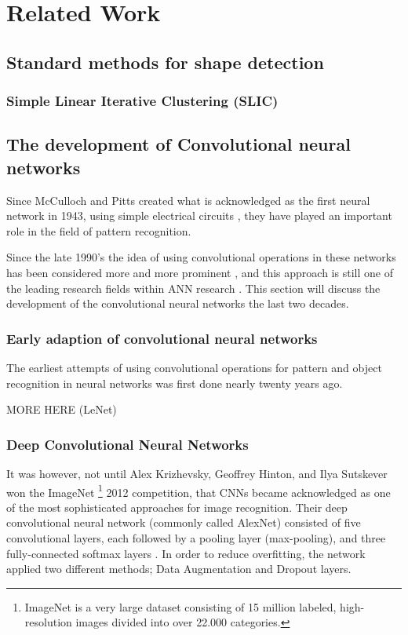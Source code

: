 \chapter{Related Work}

\section{Standard methods for shape detection}

\subsection{Simple Linear Iterative Clustering (SLIC)}

\section{The development of Convolutional neural networks}
Since McCulloch and Pitts created what is acknowledged as the first neural network in 1943, using simple electrical circuits \citep{Mcculloch1990}, they have played an important role in the field of pattern recognition. 

Since the late 1990's the idea of using convolutional operations in these networks has been considered more and more prominent \citep{LeC}, and this approach is still one of the leading research fields within ANN research \citep{Wu2017}. This section will discuss the development of the convolutional neural networks the last two decades.

\subsection{Early adaption of convolutional neural networks}
The earliest attempts of using convolutional operations for pattern and object recognition in neural networks was first done nearly twenty years ago. 

MORE HERE (LeNet)

\subsection{Deep Convolutional Neural Networks}
It was however, not until Alex Krizhevsky, Geoffrey Hinton, and Ilya Sutskever won the ImageNet \footnote{ImageNet is a very large dataset consisting of 15 million labeled, high-resolution images divided into over 22.000 categories.} 2012 competition, that CNNs became acknowledged as one of the most sophisticated approaches for image recognition. Their deep convolutional neural network (commonly called AlexNet) consisted of five convolutional layers, each followed by a pooling layer (max-pooling), and three fully-connected softmax layers \citep{Krizhevsky2012}.  In order to reduce overfitting, the network applied two different methods; Data Augmentation and Dropout layers.


